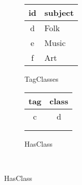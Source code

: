 \begin{figure}[htb]
\begin{subfigure}[b]{0.2\textwidth}
\begin{center}
\begin{tabular}{|c|l|}
				\hline
				id & \multicolumn{1}{|c|}{subject} \\
				\hline
				d & Folk \\
				\hline
				e & Music \\
				\hline
				f & Art \\
				\hline
			\end{tabular}
			\caption{\textsf{TagClasses}}
			\label{example-rdb-tagclasses}
		\end{center}
	\end{subfigure}
	\begin{subfigure}[b]{0.16\textwidth}
		\begin{center}
			\begin{tabular}{|c|c|}
				\hline
				tag & class\\
				\hline
				c & d \\
				\hline \\ \\
			\end{tabular}
			\caption{\textsf{HasClass}}
			\label{example-rdb-hasClass}
		\end{center}
	\end{subfigure}

	\


\end{figure}
